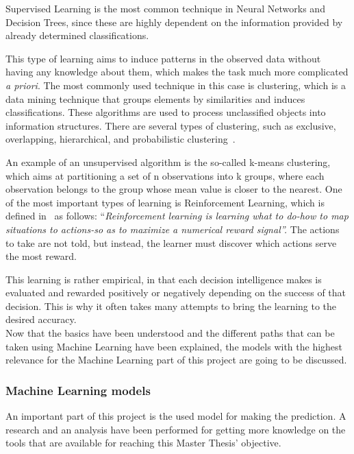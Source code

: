 Supervised Learning is the most common technique in Neural Networks and Decision Trees, since these are highly dependent on the information provided by already determined classifications.

This type of learning aims to induce patterns in the observed data without having any knowledge about them, which makes the task much more complicated \textit{a priori}. The most commonly used technique in this case is clustering, which is a data mining technique that groups elements by similarities and induces classifications. These algorithms are used to process unclassified objects into information structures. There are several types of clustering, such as exclusive, overlapping, hierarchical, and probabilistic clustering~\cite{WhatisUn52:online}.


An example of an unsupervised algorithm is the so-called k-means clustering, which aims at partitioning a set of n observations into k groups, where each observation belongs to the group whose mean value is closer to the nearest.
One of the most important types of learning is Reinforcement Learning, which is defined in~\cite{sutton2018reinforcement} as follows: ``\textit{Reinforcement learning is learning what to do-how to map situations to actions-so as to maximize a numerical reward signal''.}  The actions to take are not told, but instead, the learner must discover which actions serve the most reward.

This learning is rather empirical, in that each decision intelligence makes is evaluated and rewarded positively or negatively depending on the success of that decision. This is why it often takes many attempts to bring the learning to the desired accuracy.\\

Now that the basics have been understood and the different paths that can be taken using Machine Learning have been explained, the models with the highest relevance for the Machine Learning part of this project are going to be discussed.

\subsubsection{Machine Learning models}
An important part of this project is the used model for making the prediction. A research and an analysis have been performed for getting more knowledge on the tools that are available for reaching this Master Thesis' objective.

